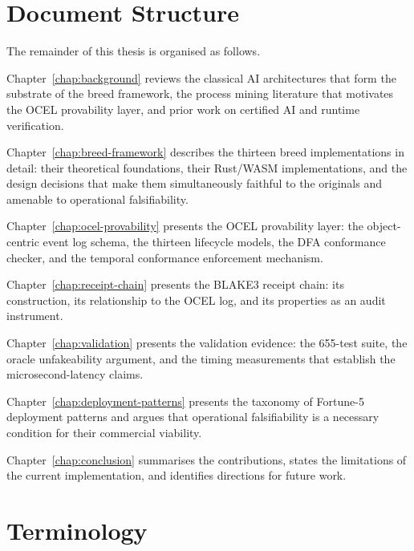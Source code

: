 \section{Document Structure}
\label{sec:document-structure}

The remainder of this thesis is organised as follows.

Chapter~\ref{chap:background} reviews the classical AI architectures that form the
substrate of the breed framework, the process mining literature that motivates the OCEL
provability layer, and prior work on certified AI and runtime verification.

Chapter~\ref{chap:breed-framework} describes the thirteen breed implementations in
detail: their theoretical foundations, their Rust/WASM implementations, and the
design decisions that make them simultaneously faithful to the originals and amenable
to operational falsifiability.

Chapter~\ref{chap:ocel-provability} presents the OCEL provability layer: the
object-centric event log schema, the thirteen lifecycle models, the DFA conformance
checker, and the temporal conformance enforcement mechanism.

Chapter~\ref{chap:receipt-chain} presents the BLAKE3 receipt chain: its construction,
its relationship to the OCEL log, and its properties as an audit instrument.

Chapter~\ref{chap:validation} presents the validation evidence: the 655-test suite,
the oracle unfakeability argument, and the timing measurements that establish the
microsecond-latency claims.

Chapter~\ref{chap:deployment-patterns} presents the taxonomy of Fortune-5 deployment
patterns and argues that operational falsifiability is a necessary condition for
their commercial viability.

Chapter~\ref{chap:conclusion} summarises the contributions, states the limitations of
the current implementation, and identifies directions for future work.

\section{Terminology}
\label{sec:terminology}

